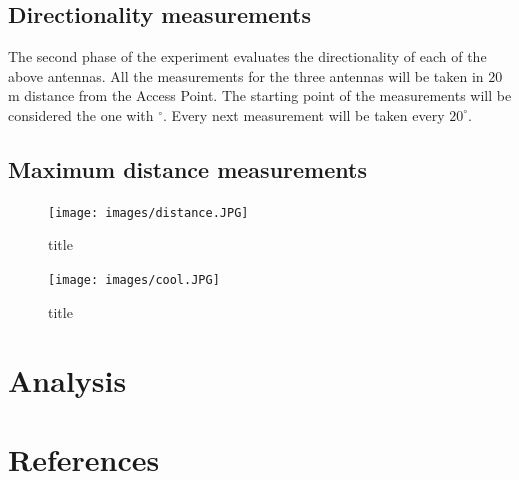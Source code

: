 \documentclass[12pt,a4paper]{article}
\begin{document}
	\subsection{Directionality measurements}
		The second phase of the experiment evaluates the directionality of each of the above antennas. All the measurements for the three antennas will be taken in $20$m distance from the Access Point. The starting point of the measurements will be considered the one with $^{\circ}$. Every next measurement will be taken every $20^{\circ}$.

	\subsection{Maximum distance measurements}
		\begin{figure}
			\texttt{[image: images/distance.JPG]}
			\caption{title}
			\label{distance}
		\end{figure}
		
		\begin{figure}
			\texttt{[image: images/cool.JPG]}
			\caption{title}
			\label{cool}
		\end{figure}




\section{Analysis}

\section{References}


\end{document}
